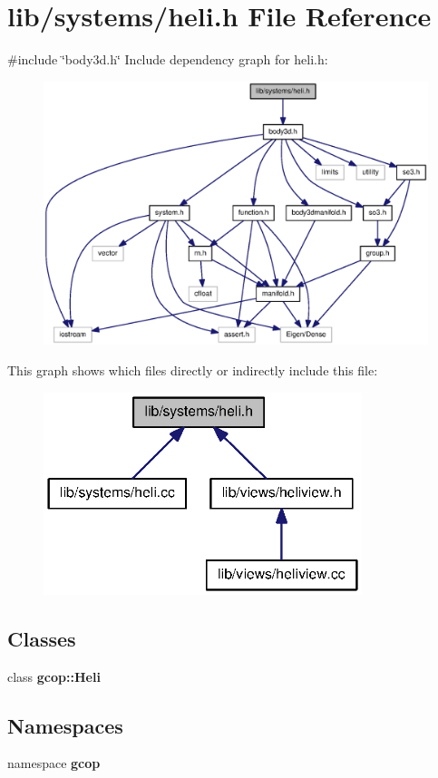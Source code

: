 \section{lib/systems/heli.h \-File \-Reference}
\label{heli_8h}
{\ttfamily \#include \char`\"{}body3d.\-h\char`\"{}}\*
\-Include dependency graph for heli.\-h\-:
\nopagebreak
\begin{figure}[H]
\begin{center}
\leavevmode
\includegraphics[width=350pt]{heli_8h__incl}
\end{center}
\end{figure}
\-This graph shows which files directly or indirectly include this file\-:
\nopagebreak
\begin{figure}[H]
\begin{center}
\leavevmode
\includegraphics[width=263pt]{heli_8h__dep__incl}
\end{center}
\end{figure}
\subsection*{\-Classes}
\begin{DoxyCompactItemize}
\item 
class {\bf gcop\-::\-Heli}
\end{DoxyCompactItemize}
\subsection*{\-Namespaces}
\begin{DoxyCompactItemize}
\item 
namespace {\bf gcop}
\end{DoxyCompactItemize}
